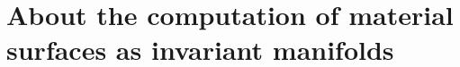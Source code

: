 \section{About the computation of material surfaces as invariant manifolds}
\label{sec:about_the_computation_of_material_surfaces_as_invariant_manifolds}


